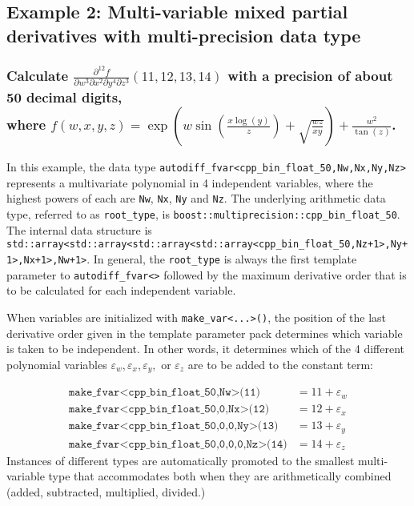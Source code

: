 \documentclass{article}
\begin{document}
\subsection{Example 2: Multi-variable mixed partial derivatives with multi-precision data type}
\subsubsection{Calculate $\frac{\partial^{12}f}{\partial w^{3}\partial x^{2}\partial y^{4}\partial z^{3}}(11,12,13,14)$
with a precision of about 50 decimal digits,\\
where $f(w,x,y,z)=\exp\left(w\sin\left(\frac{x\log(y)}{z}\right)+\sqrt{\frac{wz}{xy}}\right)+\frac{w^2}{\tan(z)}$.}

In this example, the data type {\tt autodiff\_fvar<cpp\_bin\_float\_50,Nw,Nx,Ny,Nz>} represents
a multivariate polynomial in 4 independent variables, where the highest powers of each are {\tt Nw}, {\tt Nx},
{\tt Ny} and {\tt Nz}. The underlying arithmetic data type, referred to as {\tt root\_type}, is
{\tt boost::multiprecision::cpp\_bin\_float\_50}. The internal data structure is
{\tt std::array<std::array<std::array<std::array<cpp\_bin\_float\_50,Nz+1>,Ny+1>,Nx+1>,Nw+1>}. In general, the
{\tt root\_type} is always the first template parameter to {\tt autodiff\_fvar<>} followed by the maximum
derivative order that is to be calculated for each independent variable.

When variables are initialized with {\tt make\_var<...>()}, the position of the last derivative order given in
the template parameter pack determines which variable is taken to be independent. In other words, it determines
which of the 4 different polynomial variables $\varepsilon_w,\varepsilon_x,\varepsilon_y,$ or $\varepsilon_z$
are to be added to the constant term:

\begin{align*}
\texttt{make\_fvar<cpp\_bin\_float\_50,Nw>(11)} &= 11+\varepsilon_w \\
\texttt{make\_fvar<cpp\_bin\_float\_50,0,Nx>(12)} &= 12+\varepsilon_x \\
\texttt{make\_fvar<cpp\_bin\_float\_50,0,0,Ny>(13)} &= 13+\varepsilon_y \\
\texttt{make\_fvar<cpp\_bin\_float\_50,0,0,0,Nz>(14)} &= 14+\varepsilon_z
\end{align*}
Instances of different types are automatically promoted to the smallest multi-variable type that accommodates
both when they are arithmetically combined (added, subtracted, multiplied, divided.)
\end{document}
